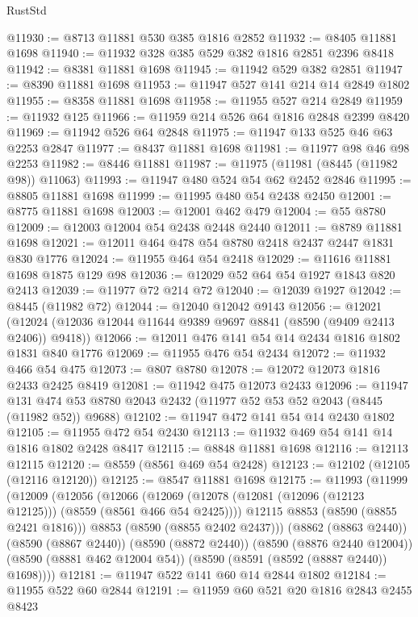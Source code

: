 \begin{lexlean}{RustStd}
\begin{coremodule}
@11930 := @8713 @11881 @530 @385 @1816 @2852
@11932 := @8405 @11881 @1698
@11940 := @11932 @328 @385 @529 @382 @1816 @2851 @2396 @8418
@11942 := @8381 @11881 @1698
@11945 := @11942 @529 @382 @2851
@11947 := @8390 @11881 @1698
@11953 := @11947 @527 @141 @214 @14 @2849 @1802
@11955 := @8358 @11881 @1698
@11958 := @11955 @527 @214 @2849
@11959 := @11932 @125
@11966 := @11959 @214 @526 @64 @1816 @2848 @2399 @8420
@11969 := @11942 @526 @64 @2848
@11975 := @11947 @133 @525 @46 @63 @2253 @2847
@11977 := @8437 @11881 @1698
@11981 := @11977 @98 @46 @98 @2253
@11982 := @8446 @11881
@11987 := @11975 (@11981 (@8445 (@11982 @98)) @11063)
@11993 := @11947 @480 @524 @54 @62 @2452 @2846
@11995 := @8805 @11881 @1698
@11999 := @11995 @480 @54 @2438 @2450
@12001 := @8775 @11881 @1698
@12003 := @12001 @462 @479
@12004 := @55 @8780
@12009 := @12003 @12004 @54 @2438 @2448 @2440
@12011 := @8789 @11881 @1698
@12021 := @12011 @464 @478 @54 @8780 @2418 @2437 @2447 @1831 @830 @1776
@12024 := @11955 @464 @54 @2418
@12029 := @11616 @11881 @1698 @1875 @129 @98
@12036 := @12029 @52 @64 @54 @1927 @1843 @820 @2413
@12039 := @11977 @72 @214 @72
@12040 := @12039 @1927
@12042 := @8445 (@11982 @72)
@12044 := @12040 @12042 @9143
@12056 := @12021 (@12024 (@12036 @12044 @11644 @9389 @9697 @8841 (@8590 (@9409 @2413 @2406)) @9418))
@12066 := @12011 @476 @141 @54 @14 @2434 @1816 @1802 @1831 @840 @1776
@12069 := @11955 @476 @54 @2434
@12072 := @11932 @466 @54 @475
@12073 := @807 @8780
@12078 := @12072 @12073 @1816 @2433 @2425 @8419
@12081 := @11942 @475 @12073 @2433
@12096 := @11947
    @131
    @474
    @53
    @8780
    @2043
    @2432
    (@11977 @52 @53 @52 @2043 (@8445 (@11982 @52)) @9688)
@12102 := @11947 @472 @141 @54 @14 @2430 @1802
@12105 := @11955 @472 @54 @2430
@12113 := @11932 @469 @54 @141 @14 @1816 @1802 @2428 @8417
@12115 := @8848 @11881 @1698
@12116 := @12113 @12115
@12120 := @8559 (@8561 @469 @54 @2428)
@12123 := @12102 (@12105 (@12116 @12120))
@12125 := @8547 @11881 @1698
@12175 := @11993
    (@11999
      (@12009
        (@12056
          (@12066
            (@12069 (@12078 (@12081 (@12096 (@12123 @12125))) (@8559 (@8561 @466 @54 @2425))))
            @12115
            @8853
            (@8590 (@8855 @2421 @1816)))
          @8853
          (@8590 (@8855 @2402 @2437)))
        (@8862 (@8863 @2440))
        (@8590 (@8867 @2440))
        (@8590 (@8872 @2440))
        (@8590 (@8876 @2440 @12004))
        (@8590 (@8881 @462 @12004 @54))
        (@8590 (@8591 (@8592 (@8887 @2440)) @1698))))
@12181 := @11947 @522 @141 @60 @14 @2844 @1802
@12184 := @11955 @522 @60 @2844
@12191 := @11959 @60 @521 @20 @1816 @2843 @2455 @8423

\end{coremodule}
\end{lexlean}
